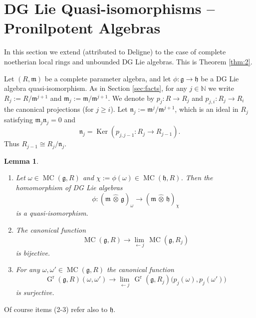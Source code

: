\documentclass[a4paper,10pt]{amsart}
\newtheorem{lem}[equation]{Lemma}
\theoremstyle{definition}
\numberwithin{equation}{section}
\newcommand{\opn}{\operatorname}
\newcommand{\mfrak}[1]{\mathfrak{#1}}
\newcommand{\mrm}[1]{\mathrm{#1}}
\newcommand{\mbb}[1]{\mathbb{#1}}
\newcommand{\what}[1]{\widehat{#1}}
\newcommand{\hatotimes}{\, \what{\otimes} \,}
\newcommand{\N}{\mbb{N}}
\newcommand{\g}{\mfrak{g}}
\newcommand{\m}{\mfrak{m}}
\newcommand{\h}{\mfrak{h}}
\newcommand{\n}{\mfrak{n}}
\newcommand{\om}{\omega}
\newcommand{\lb}{\linebreak}
\begin{document}
\section{DG Lie Quasi-isomorphisms -- Pronilpotent Algebras}
\label{sec:dg-quasi-comp}

In this section we extend \cite[Theorem 2.4]{GM} (attributed to Deligne) to the
case of complete noetherian local rings and unbounded DG Lie algebras. 
This is Theorem \ref{thm:2}.

Let $(R, \m)$ be a complete parameter algebra, and let
$\phi : \g \to \h$ be a DG Lie algebra quasi-isomorphism. 
As in Section \ref{sec:facts}, for any $j \in \N$ we write 
$R_j := R / \m^{j+1}$ and $\m_j := \m / \m^{j+1}$. We denote by 
$p_j : R \to R_j$ and $p_{j, i} : R_j \to R_i$ the canonical projections 
(for $j \geq i$).
Let $\n_j := \m^{j} / \m^{j + 1}$, which is an ideal in $R_j$ satisfying \lb
$\m_j \n_j = 0$ and 
\[ \n_j = \opn{Ker}(p_{j, j-1} : R_j \to R_{j - 1}) . \]
Thus $R_{j - 1} \cong R_j / \n_j$.

\begin{lem} \label{lem:6}
\begin{enumerate}
\item Let $\om \in  \opn{MC}(\g, R)$ and
$\chi := \phi(\om) \in \opn{MC}(\h, R)$.
Then the homomorphism of DG Lie algebras
\[ \phi :  (\m \hatotimes \g)_{\om} \to 
(\m \hatotimes \h)_{\chi} \]
is a quasi-isomorphism. 

\item The canonical function 
\[ \opn{MC}(\g, R) \to \lim_{\leftarrow j}\, \opn{MC}(\g, R_j) \]
is bijective.

\item For any $\om, \om' \in \opn{MC}(\g, R)$ the canonical function 
\[ \opn{G}^{\mrm{r}}(\g, R)(\om, \om') \to \lim_{\leftarrow j}\, 
\opn{G}^{\mrm{r}} ( \g, R_j) \bigl( p_j(\om), p_j(\om') \bigr) \]
is surjective.
\end{enumerate}
\end{lem}

Of course items (2-3) refer also to $\h$.
\end{document}
